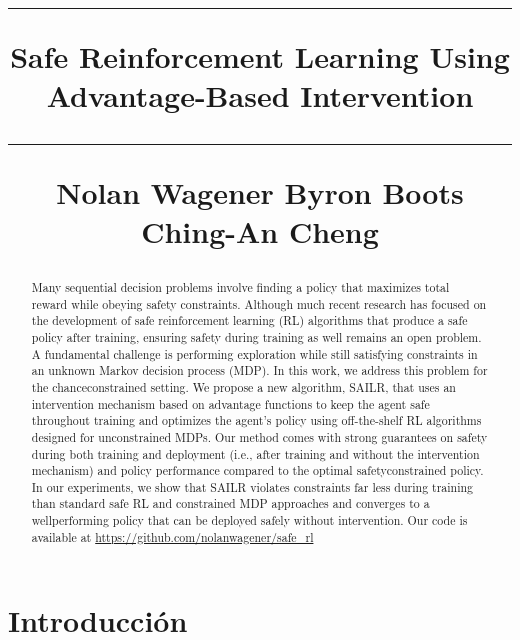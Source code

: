 \documentclass[twocolumn]{article}
\title{\bfseries{\fontsize{14}{14}\selectfont \vspace{15pt} \hrule \vspace{15pt} Safe Reinforcement Learning Using Advantage-Based Intervention \vspace{15pt} \hrule \vspace{15pt} \fontsize{10}{13}\selectfont Nolan Wagener \quad Byron Boots \quad Ching-An Cheng}}
\date{}
\newenvironment{abstractframe}
{\begin{mdframed}[linewidth=0pt, innerleftmargin=3pt, innerrightmargin=3pt, innerbottommargin=10pt, skipabove=\topsep, skipbelow=\topsep]}
{\end{mdframed}}
\begin{document}
\maketitle


\begin{abstractframe}
\begin{abstract}
{
  \fontsize{10}{15}\selectfont
  Many sequential decision problems involve finding a policy that maximizes total reward while obeying safety constraints. Although much recent research has focused on the development of safe reinforcement learning (RL) algorithms that produce a safe policy after training, ensuring safety during training as well remains an open problem. A fundamental challenge is performing exploration while still satisfying constraints in an unknown Markov decision process (MDP). In this work, we address this problem for the chanceconstrained setting. We propose a new algorithm, SAILR, that uses an intervention mechanism based on advantage functions to keep the agent safe throughout training and optimizes the agent’s policy using off-the-shelf RL algorithms designed for unconstrained MDPs. Our method comes with strong guarantees on safety during both training and deployment (i.e., after training and without the intervention mechanism) and policy performance compared to the optimal safetyconstrained policy. In our experiments, we show that SAILR violates constraints far less during training than standard safe RL and constrained MDP approaches and converges to a wellperforming policy that can be deployed safely without intervention. Our code is available at \url{https://github.com/nolanwagener/safe_rl}
}

\end{abstract}
\end{abstractframe}



\section{Introducción}
\lipsum[2-4] %
\end{document}
